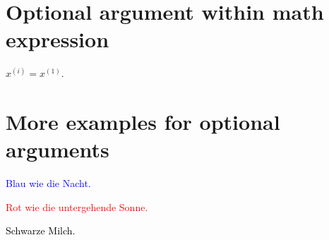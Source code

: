 \documentclass{article}
\renewcommand{\xi}[1][i]{x^{(#1)}}
\newcommand{\beispiel}[2][blue]{\textcolor{#1}{#2}}
\begin{document}
\section{Optional argument within math expression}

$\xi = \xi[1]$.

\section{More examples for optional arguments}

\beispiel{Blau wie die Nacht.}

\beispiel[red]{Rot wie die untergehende Sonne.}

\beispiel[black]{Schwarze Milch.}
\end{document}
